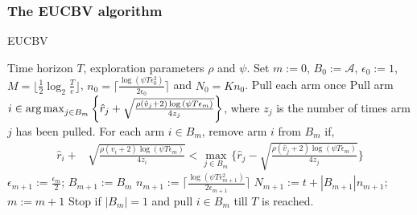 \documentclass[MS,synopsis]{iitmdiss}
\begin{document}
\subsubsection{The EUCBV algorithm}

\begin{algorithm}[!th]
\caption{EUCBV}
\label{alg:eucbv}
\begin{algorithmic}
 Time horizon $T$, exploration parameters $\rho$ and $\psi$.
 Set $m:=0$, $B_{0}:=\mathcal{A}$, $\epsilon_{0}:=1$, $M=\big \lfloor \frac{1}{2}\log_{2} \frac{T}{e}\big\rfloor$, $n_{0}=\big\lceil\frac{\log{(\psi T\epsilon_{0}^{2})}}{2\epsilon_{0}}\big\rceil$ and  $N_{0}=Kn_{0}$.
\State Pull each arm once
\State Pull arm $i\in \operatorname*{arg\,max}_{j\in B_{m}}\bigg\lbrace \hat{r}_{j} + \sqrt{\frac{\rho(\hat{v}_{j}+2)\log{(\psi T\epsilon_{m})}}{4 z_{j}}} \bigg\rbrace$, where $z_j$ is the number of times arm $j$ has been pulled.
\ArmElim
\State For each arm $i \in B_{m}$, remove arm $i$ from $B_{m}$ if,
\begin{align*}
 \hat{r}_{i} + & \sqrt{\frac{\rho(\hat{v}_{i}+2)\log{(\psi T\epsilon_{m})}}{4 z_{i}}}  
  < \max_{{j}\in B_{m}}\bigg\lbrace\hat{r}_{j} -\sqrt{\frac{\rho(\hat{v}_{j}+2)\log{(\psi T\epsilon_{m})}}{4 z_{j}}} \bigg\rbrace
\end{align*}
\EndArmElim
{}
\ResParam
\State $\epsilon_{m+1}:=\frac{\epsilon_{m}}{2}$; $B_{m+1}:=B_{m}$
\State $n_{m+1}:=\bigg\lceil\frac{\log{(\psi T\epsilon_{m+1}^{2})}}{2\epsilon_{m+1}}\bigg\rceil$
\State $N_{m+1}:=t+|B_{m+1}| n_{m+1}$; $m:=m+1$
\EndResParam
\EndIf
\State Stop if $|B_{m}|=1$ and pull ${i}\in B_{m}$ till $T$ is reached.
\EndFor
\end{algorithmic}
\end{algorithm}
\end{document}
